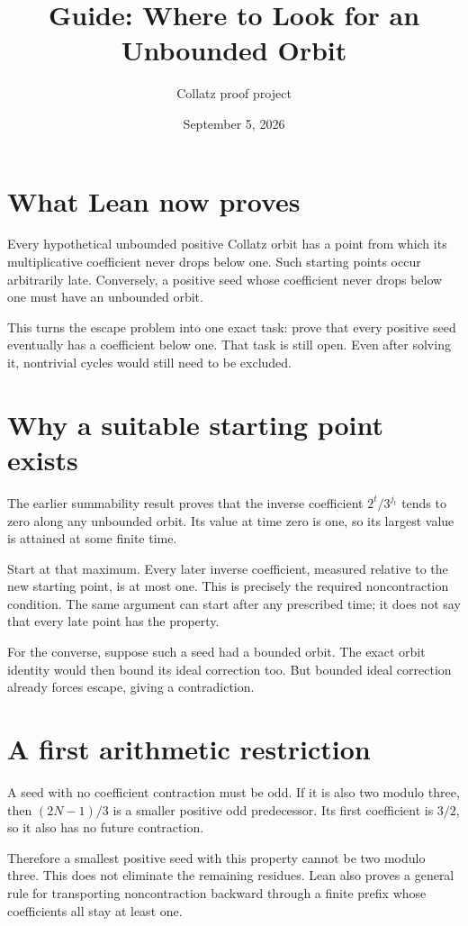 \documentclass[10pt]{article}
\title{Guide: Where to Look for an Unbounded Orbit}
\author{Collatz proof project}
\date{September 5, 2026}
\begin{document}
\maketitle
\section*{What Lean now proves}
Every hypothetical unbounded positive Collatz orbit has a point from which
its multiplicative coefficient never drops below one. Such starting points
occur arbitrarily late. Conversely, a positive seed whose coefficient
never drops below one must have an unbounded orbit.

This turns the escape problem into one exact task: prove that every positive
seed eventually has a coefficient below one. That task is still open.
Even after solving it, nontrivial cycles would still need to be excluded.

\section*{Why a suitable starting point exists}
The earlier summability result proves that the inverse coefficient
$2^t/3^{j_t}$ tends to zero along any unbounded orbit. Its value at time zero
is one, so its largest value is attained at some finite time.

Start at that maximum. Every later inverse coefficient, measured relative
to the new starting point, is at most one. This is precisely the required
noncontraction condition. The same argument can start after any prescribed
time; it does not say that every late point has the property.

For the converse, suppose such a seed had a bounded orbit. The exact orbit
identity would then bound its ideal correction too. But bounded ideal
correction already forces escape, giving a contradiction.

\section*{A first arithmetic restriction}
A seed with no coefficient contraction must be odd. If it is also two
modulo three, then $(2N-1)/3$ is a smaller positive odd predecessor. Its
first coefficient is $3/2$, so it also has no future contraction.

Therefore a smallest positive seed with this property cannot be two modulo
three. This does not eliminate the remaining residues. Lean also proves
a general rule for transporting noncontraction backward through a finite
prefix whose coefficients all stay at least one.
\end{document}
